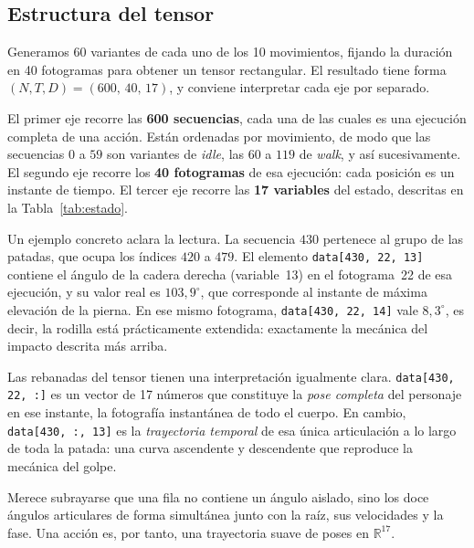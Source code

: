 \documentclass[10pt,twocolumn]{article}
\begin{document}
\subsection{Estructura del tensor}
Generamos 60 variantes de cada uno de los 10 movimientos, fijando la duración en
40 fotogramas para obtener un tensor rectangular. El resultado tiene forma
$(N,T,D)=(600,\,40,\,17)$, y conviene interpretar cada eje por separado.

El primer eje recorre las \textbf{600 secuencias}, cada una de las cuales es una
ejecución completa de una acción. Están ordenadas por movimiento, de modo que las
secuencias $0$ a $59$ son variantes de \emph{idle}, las $60$ a $119$ de
\emph{walk}, y así sucesivamente. El segundo eje recorre los \textbf{40
fotogramas} de esa ejecución: cada posición es un instante de tiempo. El tercer
eje recorre las \textbf{17 variables} del estado, descritas en la
Tabla~\ref{tab:estado}.

Un ejemplo concreto aclara la lectura. La secuencia $430$ pertenece al grupo de
las patadas, que ocupa los índices $420$ a $479$. El elemento
\texttt{data[430,\,22,\,13]} contiene el ángulo de la cadera derecha
(variable~13) en el fotograma~22 de esa ejecución, y su valor real es
$103{,}9^\circ$, que corresponde al instante de máxima elevación de la pierna.
En ese mismo fotograma, \texttt{data[430,\,22,\,14]} vale $8{,}3^\circ$, es
decir, la rodilla está prácticamente extendida: exactamente la mecánica del
impacto descrita más arriba.

Las rebanadas del tensor tienen una interpretación igualmente clara.
\texttt{data[430,\,22,\,:]} es un vector de 17 números que constituye la
\emph{pose completa} del personaje en ese instante, la fotografía instantánea de
todo el cuerpo. En cambio, \texttt{data[430,\,:,\,13]} es la \emph{trayectoria
temporal} de esa única articulación a lo largo de toda la patada: una curva
ascendente y descendente que reproduce la mecánica del golpe.

Merece subrayarse que una fila no contiene un ángulo aislado, sino los doce
ángulos articulares de forma simultánea junto con la raíz, sus velocidades y la
fase. Una acción es, por tanto, una trayectoria suave de poses en
$\mathbb{R}^{17}$.
\end{document}

